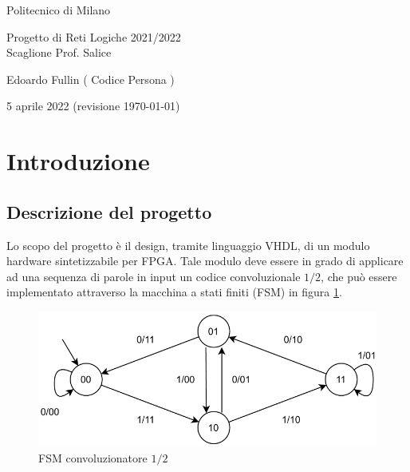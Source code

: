 \documentclass[12pt, a4paper]{article}
\begin{document}
\begin{titlepage}
    \centering

    \vspace{0.5cm} {
        \large Politecnico di Milano\\
    }

    \vspace{5cm} {
        \huge {
            Progetto di Reti Logiche 2021/2022\\
        }
        \vspace{0.5cm}
        \large {Scaglione Prof. Salice}
    }

    \vspace{2cm} {
        \large
        Edoardo Fullin ( Codice Persona )
    }

    \vspace*{\fill}
    5 aprile 2022 (revisione \today)

\end{titlepage}

\tableofcontents

\pagebreak

\section{Introduzione}

\subsection{Descrizione del progetto}

Lo scopo del progetto è il design, tramite linguaggio VHDL, di un modulo hardware sintetizzabile per FPGA.
Tale modulo deve essere in grado di applicare ad una sequenza di parole in input un codice convoluzionale $1/2$, che 
può essere implementato attraverso la macchina a stati finiti (FSM) in figura \ref{fig:fsm_conv}.


\begin{figure}[!ht]
    \centering
    \includegraphics[scale=0.7]{convoluzionatore_1_2_fsm.png}
    \caption{FSM convoluzionatore $1/2$}
    \label{fig:fsm_conv}
\end{figure}
\end{document}
